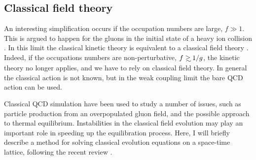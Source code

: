 \subsection{Classical field theory}
\label{sec_cl_QCD}

 An interesting simplification occurs if the occupation numbers are large,
$f\gg 1$. This is argued to happen for the gluons in the initial state of a 
heavy ion collision \cite{McLerran:1993ni}. In this limit the classical 
kinetic theory is equivalent to a classical field theory \cite{Mueller:2002gd}.
Indeed, if the occupations numbers are non-perturbative, $f\gsim 1/g$, the 
kinetic theory no longer applies, and we have to rely on classical field 
theory. In general the classical action is not known, but in the weak 
coupling limit the bare QCD action can be used. 
 
 Classical QCD simulation have been used to study a number of issues,
such as particle production from an overpopulated gluon field, and 
the possible approach to thermal equilibrium. Instabilities in the 
classical field evolution may play an important role in speeding
up the equilibration process. Here, I will briefly describe a
method for solving classical evolution equations on a space-time
lattice, following the recent review \cite{Mrowczynski:2016etf}.

